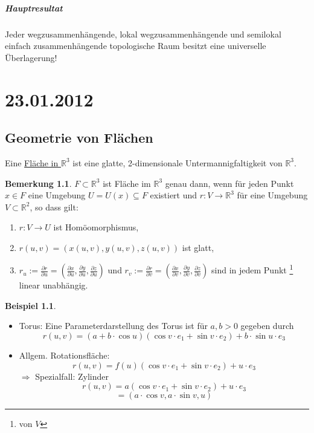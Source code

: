 \documentclass[a4paper,11pt,notitlepage]{report}
\theoremstyle{definition}
\newtheorem{remark}{Bemerkung}[chapter]
\newtheorem{example}{Beispiel}[chapter]
\newcommand{\R}{{\ensuremath{\mathbb{R}}}}
\begin{document}
\paragraph{Hauptresultat}
Jeder wegzusammenhängende, lokal wegzusammenhängende und semilokal einfach zusammenhängende topologische Raum besitzt eine universelle Überlagerung!

\chapter{23.01.2012}
\section{Geometrie von Flächen}

\begin{definition}[Fläche in $\R^3$]
	Eine \underline{Fläche in $\R^3$} ist eine glatte, 2-dimensionale Untermannigfaltigkeit von $\R^3$.
\end{definition}

\begin{remark}{}
	$F \subset \R^3$ ist Fläche im $\R^3$ genau dann, wenn für jeden Punkt $x \in F$ eine Umgebung $U=U(x) \subseteq F$ existiert und $r \colon V \rightarrow \R^3$ für eine Umgebung $V \subset \R^2$, so dass gilt:
	\begin{enumerate}
		\item $r \colon V \rightarrow U$ ist Homöomorphismus,
		\item $r(u,v) = (x(u,v), y(u,v), z(u,v))$ ist glatt,
		\item $r_u := \frac{\partial r}{\partial u} = \left ( \frac{\partial x}{\partial u}, \frac{\partial y}{\partial u}, \frac{\partial z}{\partial u} \right )$ und $r_v := \frac{\partial r}{\partial v} = \left ( \frac{\partial x}{\partial v}, \frac{\partial y}{\partial v}, \frac{\partial z}{\partial v} \right )$ sind in jedem Punkt \footnote{von $V$} linear unabhängig.
	\end{enumerate}
\end{remark}

\begin{example}{}
\begin{itemize}
	\item Torus:
	\newline
	Eine Parameterdarstellung des Torus ist für $a,b > 0$ gegeben durch
	$$r(u,v) = (a + b \cdot \cos u) (\cos v \cdot e_1 + \sin v \cdot e_2) + b \cdot \sin u \cdot e_3$$
	\item Allgem. Rotationsfläche: \newline
	$$r(u,v) = f(u) (\cos v \cdot e_1 + \sin v \cdot e_2) + u \cdot e_3$$
	$\Rightarrow$ Spezialfall: Zylinder
	$$r(u,v) = a (\cos v \cdot e_1 + \sin v \cdot e_2) + u \cdot e_3$$
	$$= (a \cdot \cos v, a \cdot \sin v, u)$$
\end{itemize}
\end{example}
\end{document}
